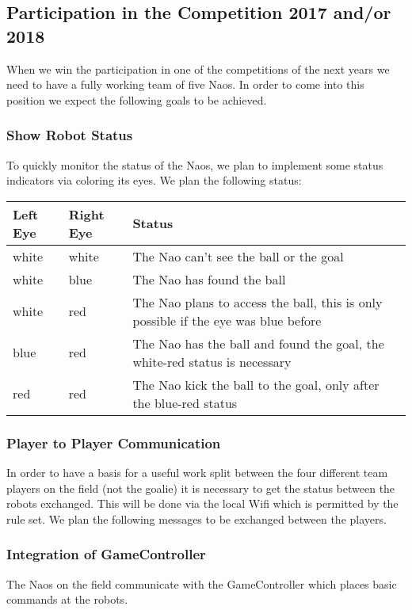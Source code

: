 \documentclass[12pt]{article}
\theoremstyle{definition}
\newcommand{\unclear}[1]{\vspace{.5em}\parbox{.9\linewidth}{\color{red}{\bf Remark: #1}}\vspace{.5em}}
\begin{document}
\subsection{Participation in the Competition 2017 and/or 2018}
When we win the participation in one of the competitions of the next years we need to have a fully working team of five Naos. In order to come into this position we expect the following goals to be achieved.

\subsubsection{Show Robot Status}
To quickly monitor the status of the Naos, we plan to implement some status indicators via coloring its eyes. We plan the following status:
\\[1em]
\unclear{In the next table: What is if the Nao sees the goal? What means the red/red status? What do you mean by ``the x/y state is necessary?}

\begin{tabular}{|p{.12\linewidth}|p{.12\linewidth}|p{.68\linewidth}|}
\hline 
Left Eye & Right Eye & Status \\ \hline
white & white & The Nao can't see the ball or the goal\\
white & blue & The Nao has found the ball\\
white & red & The Nao plans to access the ball, this is only possible if the eye was blue before\\
blue & red & The Nao has the ball and found the goal, the white-red status is necessary \\
red & red & The Nao kick the ball to the goal, only after the blue-red status \\ \hline
\end{tabular}

\subsubsection{Player to Player Communication}
In order to have a basis for a useful work split between the four different team players on the field (not the goalie) it is necessary to get the status between the robots exchanged. This will be done via the local Wifi which is permitted by the rule set. We plan the following messages to be exchanged between the players.

\subsubsection{Integration of GameController}
The Naos on the field communicate with the GameController which places basic commands at the robots.
\end{document}
